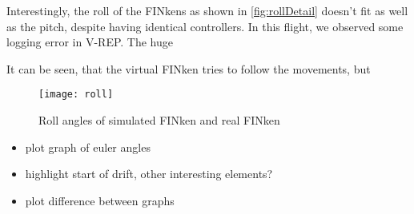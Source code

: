 Interestingly, the roll of the FINkens as shown in \ref{fig:rollDetail} doesn't fit as well as the pitch, despite having identical controllers.
In this flight, we observed some logging error in V-REP. 
The huge

It can be seen, that the virtual FINken tries to follow the movements, but
\begin{figure}
	\begin{center}
	\texttt{[image: roll]}
	\caption{Roll angles of simulated FINken and real FINken}
	\label{pic:rollResponse}
	\end{center}
\end{figure}


\begin{itemize}
\item{plot graph of euler angles}
\item{highlight start of drift, other interesting elements?}
\item{plot difference between graphs}

\end{itemize}


